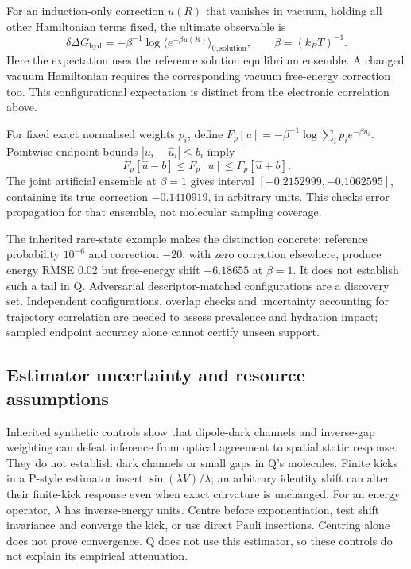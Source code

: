 \documentclass{article}
\begin{document}
For an induction-only correction $u(R)$ that vanishes in vacuum, holding all other Hamiltonian terms fixed, the ultimate observable is
\begin{equation*}
\delta\Delta G_{\mathrm{hyd}}=-\beta^{-1}\log\langle e^{-\beta u(R)}\rangle_{0,\mathrm{solution}},\qquad \beta=(k_BT)^{-1}.
\end{equation*}
Here the expectation uses the reference solution equilibrium ensemble. A changed vacuum Hamiltonian requires the corresponding vacuum free-energy correction too. This configurational expectation is distinct from the electronic correlation above.

For fixed exact normalised weights $p_i$, define $F_p[u]=-\beta^{-1}\log\sum_i p_i e^{-\beta u_i}$. Pointwise endpoint bounds $|u_i-\widehat u_i|\le b_i$ imply
\begin{equation*}
F_p[\widehat u-b]\le F_p[u]\le F_p[\widehat u+b].
\end{equation*}
The joint artificial ensemble at $\beta=1$ gives interval $[-0.2152999,-0.1062595]$, containing its true correction $-0.1410919$, in arbitrary units. This checks error propagation for that ensemble, not molecular sampling coverage.

The inherited rare-state example makes the distinction concrete: reference probability $10^{-6}$ and correction $-20$, with zero correction elsewhere, produce energy RMSE 0.02 but free-energy shift $-6.18655$ at $\beta=1$. It does not establish such a tail in Q. Adversarial descriptor-matched configurations are a discovery set. Independent configurations, overlap checks and uncertainty accounting for trajectory correlation are needed to assess prevalence and hydration impact; sampled endpoint accuracy alone cannot certify unseen support.

\subsection{Estimator uncertainty and resource assumptions}

Inherited synthetic controls show that dipole-dark channels and inverse-gap weighting can defeat inference from optical agreement to spatial static response. They do not establish dark channels or small gaps in Q's molecules. Finite kicks in a P-style estimator insert $\sin(\lambda V)/\lambda$; an arbitrary identity shift can alter their finite-kick response even when exact curvature is unchanged. For an energy operator, $\lambda$ has inverse-energy units. Centre before exponentiation, test shift invariance and converge the kick, or use direct Pauli insertions. Centring alone does not prove convergence. Q does not use this estimator, so these controls do not explain its empirical attenuation.
\end{document}
